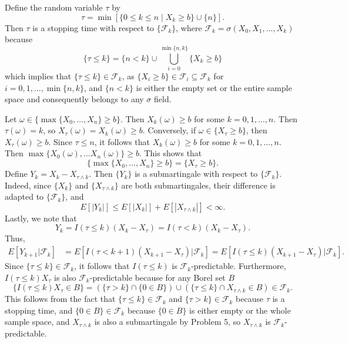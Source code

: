 \documentclass{homework}
\newcommand{\fil}{\mathcal{F}}
\begin{document}
	\question Define the random variable $\tau$ by
	\begin{equation*}
		\tau = \min\left[\{0 \le k \le n \mid X_k \ge b\} \cup \{n\}\right].
	\end{equation*}
	Then $\tau$ is a stopping time with respect to $\{\fil_k\}$, where $\fil_k = \sigma(X_0, X_1,\dots, X_k)$ because
	\begin{equation*}
		\{\tau \le k\} = \{n < k\} \cup \bigcup_{i=0}^{\min\{n,k\}} \{X_k \ge b\}
	\end{equation*}
	which implies that $\{\tau \le k\} \in \fil_k$, as $\{X_i \ge b\} \in \fil_i \subseteq \fil_k$ for $i = 0,1,\dots,\min\{n,k\}$, and $\{n<k\}$ is either the empty set or the entire sample space and consequently belongs to any $\sigma$ field. 
	
	Let $\omega \in \{\max\{X_0, \dots, X_n\} \ge b\}$. Then $X_k(\omega) \ge b$ for some $k =0,1,\dots, n$. Then $\tau(\omega) = k$, so $X_\tau(\omega) = X_k(\omega) \ge b$. Conversely, if $\omega \in \{X_\tau \ge b\}$, then $X_\tau(\omega) \ge b$. Since $\tau \le n$, it follows that $X_k(\omega) \ge b$ for some $k =0,1,\dots, n$. Then $\max\{X_0(\omega), \dots X_n(\omega)\} \ge b$. This shows that
	\begin{equation*}
		\{\max\{X_0, \dots,X_n\} \ge b\} = \{X_\tau \ge b\}.
	\end{equation*}
	Define $Y_k = X_k - X_{\tau\wedge k}$. Then $\{Y_k\}$ is a submartingale with respect to $\{\fil_k\}$. Indeed, since $\{X_k\}$ and $\{X_{\tau\wedge k}\}$ are both submartingales, their difference is adapted to $\{\fil_k\}$, and
	\begin{equation*}
		E[|Y_k|] \le E[|X_k|] + E[|X_{\tau\wedge k}|] < \infty.
	\end{equation*}
	Lastly, we note that
	\begin{equation*}
		Y_k = I(\tau \le k)(X_k - X_\tau) = I(\tau < k)(X_k - X_\tau).
	\end{equation*}
	Thus,
	\begin{align*}
		E[Y_{k+1} |\fil_k] &= E[I(\tau < k + 1)(X_{k+1} - X_\tau)|\fil_k] =  E[I(\tau\le k)(X_{k+1}-X_\tau)|\fil_k].
	\end{align*}
	Since $\{\tau \le k\} \in \fil_k$, it follows that $I(\tau\le k)$ is $\fil_k$-predictable. Furthermore, $I(\tau\le k)X_\tau$ is also $\fil_k$-predictable because for any Borel set $B$
	\begin{equation*}
		\{I(\tau\le k)X_\tau \in B\} = (\{\tau > k\} \cap \{0 \in B\}) \cup (\{\tau \le k\} \cap X_{\tau \wedge k} \in B) \in \fil_k.
	\end{equation*}
	This follows from the fact that $\{\tau \le k\} \in \fil_k$ and $\{\tau > k\} \in \fil_k$ because $\tau$ is a stopping time, and $\{0\in B\} \in \fil_k$ because $\{0\in B\}$ is either empty or the whole sample space, and $X_{\tau\wedge k}$ is also a submartingale by Problem 5, so $X_{\tau\wedge k}$ is $\fil_k$-predictable.
	
\end{document}
